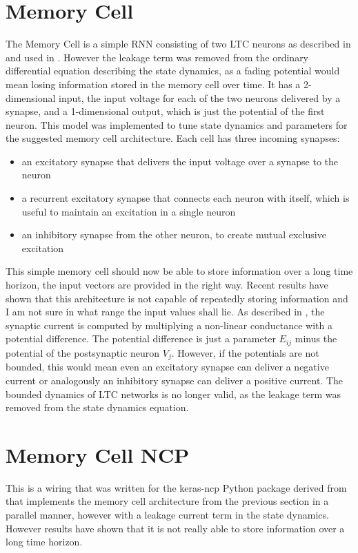 \documentclass[draft,final]{vutinfth} %
\begin{document}
    \section{Memory Cell} \label{Memory Cell}
    The Memory Cell is a simple RNN consisting of two LTC neurons as described in \cite{LTCNetworks} and used in \cite{NCP}.
    However the leakage term was removed from the ordinary differential equation describing the state dynamics, as a fading potential would mean losing information stored in the memory cell over time.
    It has a 2-dimensional input, the input voltage for each of the two neurons delivered by a synapse, and a 1-dimensional output, which is just the potential of the first neuron.
    This model was implemented to tune state dynamics and parameters for the suggested memory cell architecture.
    Each cell has three incoming synapses:
    \begin{itemize}
        \item{}
        an excitatory synapse that delivers the input voltage over a synapse to the neuron
        \item{}
        a recurrent excitatory synapse that connects each neuron with itself, which is useful to maintain an excitation in a single neuron
        \item{}
        an inhibitory synapse from the other neuron, to create mutual exclusive excitation
    \end{itemize}
    This simple memory cell should now be able to store information over a long time horizon, the input vectors are provided in the right way.
    Recent results have shown that this architecture is not capable of repeatedly storing information and I am not sure in what range the input values shall lie.
    As described in \cite{LTCNetworks}, the synaptic current is computed by multiplying a non-linear conductance with a potential difference.
    The potential difference is just a parameter $E_{ij}$ minus the potential of the postsynaptic neuron $V_j$.
    However, if the potentials are not bounded, this would mean even an excitatory synapse can deliver a negative current or analogously an inhibitory synapse can deliver a positive current.
    The bounded dynamics of LTC networks is no longer valid, as the leakage term was removed from the state dynamics equation.


    \section{Memory Cell NCP} \label{Memory Cell NCP}
    This is a wiring that was written for the keras-ncp Python package derived from \cite{NCP} that implements the memory cell architecture from the previous section in a parallel manner, however with a leakage current term in the state dynamics.
    However results have shown that it is not really able to store information over a long time horizon.
\end{document}
